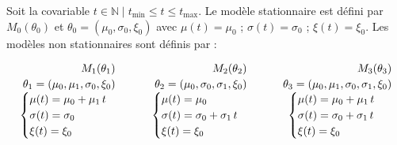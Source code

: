 \documentclass[
  article,
  nofooter,
  noheadings]{jss}
\begin{document}
\begin{tcolorbox}[enhanced jigsaw, toprule=.15mm, bottomrule=.15mm, colback=white, breakable, left=2mm, leftrule=.75mm, colframe=quarto-callout-color-frame, arc=.35mm, rightrule=.15mm, opacityback=0]

Soit la covariable
\(t \in \mathbb{N} \mid t_{\min} \leq t \leq t_{\max}\). Le modèle
stationnaire est défini par \(M_0(\theta_0)\) et
\(\theta_0 = (\mu_0, \sigma_0, \xi_0)\) avec \(\mu(t) = \mu_0\) ;
\(\sigma(t) = \sigma_0\) ; \(\xi(t) = \xi_0\). Les modèles non
stationnaires sont définis par :

\[
\begin{array}{c@{\qquad}c@{\qquad}c}
\begin{array}{c}
\begin{aligned}
M_1(\theta_1)\\[-0.2ex]
\theta_1 = (\mu_0, \mu_1, \sigma_0, \xi_0)
\end{aligned}\\[0.4ex]
\begin{cases}
\mu(t) = \mu_0 + \mu_1\, t \\
\sigma(t) = \sigma_0 \\
\xi(t) = \xi_0
\end{cases}
\end{array}
&
\begin{array}{c}
\begin{aligned}
M_2(\theta_2)\\[-0.2ex]
\theta_2 = (\mu_0, \sigma_0, \sigma_1, \xi_0)
\end{aligned}\\[0.4ex]
\begin{cases}
\mu(t) = \mu_0 \\
\sigma(t) = \sigma_0 + \sigma_1\, t \\
\xi(t) = \xi_0
\end{cases}
\end{array}
&
\begin{array}{c}
\begin{aligned}
M_3(\theta_3)\\[-0.2ex]
\theta_3 = (\mu_0, \mu_1, \sigma_0, \sigma_1, \xi_0)
\end{aligned}\\[0.4ex]
\begin{cases}
\mu(t) = \mu_0 + \mu_1\, t \\
\sigma(t) = \sigma_0 + \sigma_1\, t \\
\xi(t) = \xi_0
\end{cases}
\end{array}
\end{array}
\]

\end{tcolorbox}
\end{document}
